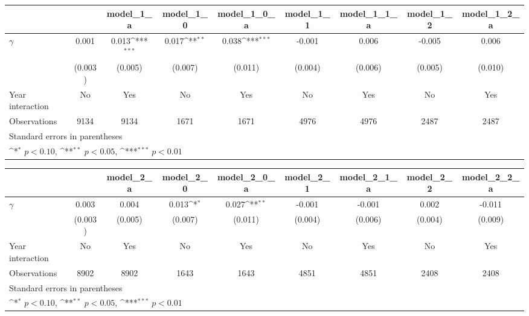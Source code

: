 {
\def\sym#1{\ifmmode^{#1}\else\(^{#1}\)\fi}
\begin{tabular}{l*{8}{c}}
\toprule
                &\multicolumn{1}{c}{}&\multicolumn{1}{c}{model\_1\_a}&\multicolumn{1}{c}{model\_1\_0}&\multicolumn{1}{c}{model\_1\_0\_a}&\multicolumn{1}{c}{model\_1\_1}&\multicolumn{1}{c}{model\_1\_1\_a}&\multicolumn{1}{c}{model\_1\_2}&\multicolumn{1}{c}{model\_1\_2\_a}\\
\midrule
$\gamma$        &    0.001         &    0.013\sym{***}&    0.017\sym{**} &    0.038\sym{***}&   -0.001         &    0.006         &   -0.005         &    0.006         \\
                &  (0.003)         &  (0.005)         &  (0.007)         &  (0.011)         &  (0.004)         &  (0.006)         &  (0.005)         &  (0.010)         \\
\addlinespace
Year interaction &       No         &      Yes         &       No         &      Yes         &       No         &      Yes         &       No         &      Yes         \\
\midrule
Observations    &     9134         &     9134         &     1671         &     1671         &     4976         &     4976         &     2487         &     2487         \\
\bottomrule
\multicolumn{9}{l}{\footnotesize Standard errors in parentheses}\\
\multicolumn{9}{l}{\footnotesize \sym{*} \(p<0.10\), \sym{**} \(p<0.05\), \sym{***} \(p<0.01\)}\\
\end{tabular}
}
{
\def\sym#1{\ifmmode^{#1}\else\(^{#1}\)\fi}
\begin{tabular}{l*{8}{c}}
\toprule
                &\multicolumn{1}{c}{}&\multicolumn{1}{c}{model\_2\_a}&\multicolumn{1}{c}{model\_2\_0}&\multicolumn{1}{c}{model\_2\_0\_a}&\multicolumn{1}{c}{model\_2\_1}&\multicolumn{1}{c}{model\_2\_1\_a}&\multicolumn{1}{c}{model\_2\_2}&\multicolumn{1}{c}{model\_2\_2\_a}\\
\midrule
$\gamma$        &    0.003         &    0.004         &    0.013\sym{*}  &    0.027\sym{**} &   -0.001         &   -0.001         &    0.002         &   -0.011         \\
                &  (0.003)         &  (0.005)         &  (0.007)         &  (0.011)         &  (0.004)         &  (0.006)         &  (0.004)         &  (0.009)         \\
\addlinespace
Year interaction &       No         &      Yes         &       No         &      Yes         &       No         &      Yes         &       No         &      Yes         \\
\midrule
Observations    &     8902         &     8902         &     1643         &     1643         &     4851         &     4851         &     2408         &     2408         \\
\bottomrule
\multicolumn{9}{l}{\footnotesize Standard errors in parentheses}\\
\multicolumn{9}{l}{\footnotesize \sym{*} \(p<0.10\), \sym{**} \(p<0.05\), \sym{***} \(p<0.01\)}\\
\end{tabular}
}
